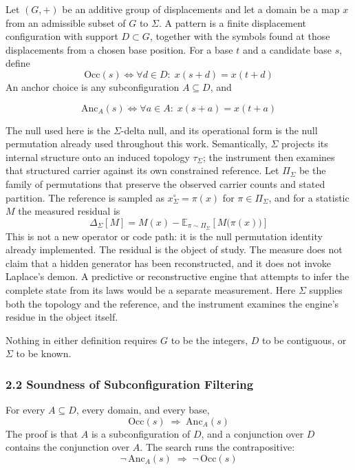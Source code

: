 Let \((G,+)\) be an additive group of displacements and let a domain be a map \(x\) from an admissible subset of \(G\) to \(\Sigma\). A pattern is a finite displacement configuration with support \(D \subset G\), together with the symbols found at those displacements from a chosen base position. For a base \(t\) and a candidate base \(s\), define
\[
  \mathrm{Occ}(s) \iff \forall d \in D:\; x(s+d) = x(t+d)
\]
An anchor choice is any subconfiguration \(A \subseteq D\), and

\[
  \mathrm{Anc}_A(s) \iff \forall a \in A:\; x(s+a) = x(t+a)
\]

The null used here is the \(\Sigma\)-delta null, and its operational form is the null permutation already used throughout this work. Semantically, \(\Sigma\) projects its internal structure onto an induced topology \(\tau_\Sigma\); the instrument then examines that structured carrier against its own constrained reference. Let \(\Pi_\Sigma\) be the family of permutations that preserve the observed carrier counts and stated partition. The reference is sampled as \(x^\circ_\Sigma = \pi(x)\) for \(\pi \in \Pi_\Sigma\), and for a statistic \(M\) the measured residual is
\[
  \Delta_\Sigma[M] = M(x) - \mathbb{E}_{\pi \sim \Pi_\Sigma}\!\left[M\bigl(\pi(x)\bigr)\right]
\]
This is not a new operator or code path: it is the null permutation identity already implemented. The residual is the object of study. The measure does not claim that a hidden generator has been reconstructed, and it does not invoke Laplace's demon. A predictive or reconstructive engine that attempts to infer the complete state from its laws would be a separate measurement. Here \(\Sigma\) supplies both the topology and the reference, and the instrument examines the engine's residue in the object itself.

Nothing in either definition requires \(G\) to be the integers, \(D\) to be contiguous, or \(\Sigma\) to be known.

\subsubsection{2.2 Soundness of Subconfiguration Filtering}

For every \(A \subseteq D\), every domain, and every base,
\[
  \mathrm{Occ}(s) \;\Longrightarrow\; \mathrm{Anc}_A(s)
\]
The proof is that \(A\) is a subconfiguration of \(D\), and a conjunction over \(D\) contains the conjunction over \(A\). The search runs the contrapositive:
\[
  \neg\,\mathrm{Anc}_A(s) \;\Longrightarrow\; \neg\,\mathrm{Occ}(s)
\]

